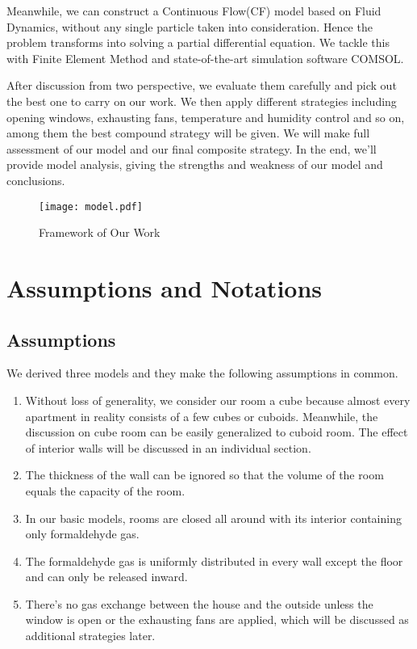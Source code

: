\documentclass{mcmthesis}
\begin{document}
Meanwhile, we can construct a Continuous Flow(CF) model based on Fluid Dynamics, without any single particle taken into consideration. Hence the problem transforms into solving a partial differential equation. We tackle this with Finite Element Method and state-of-the-art simulation software COMSOL.

After discussion from two perspective, we evaluate them carefully and pick out the best one to carry on our work. We then apply different strategies including opening windows, exhausting fans, temperature and humidity control and so on, among them the best compound strategy will be given. We will make full assessment of our model and our final composite strategy. In the end, we'll provide model analysis, giving the strengths and weakness of our model and conclusions.  

\begin{figure}[H]
  \centering
  \texttt{[image: model.pdf]}
  \caption{Framework of Our Work}
  \label{fig:Frame}
\end{figure}

\section{Assumptions and Notations}
\subsection{Assumptions}
We derived three models and they make the following assumptions in common.
\begin{enumerate}
	\item Without loss of generality, we consider our room a cube because almost every apartment in reality consists of a few cubes or cuboids. Meanwhile, the discussion on cube room can be easily generalized to cuboid room. The effect of interior walls will be discussed in an individual section.
    \item The thickness of the wall can be ignored so that the volume of the room equals the capacity of the room.
    \item In our basic models, rooms are closed all around with its interior containing only formaldehyde gas.
    \item The formaldehyde gas is uniformly distributed in every wall except the floor and can only be released inward.
   \item There's no gas exchange between the house and the outside unless the window is open or the exhausting fans are applied, which will be discussed as additional strategies later.
   
\end{enumerate}
\end{document}
